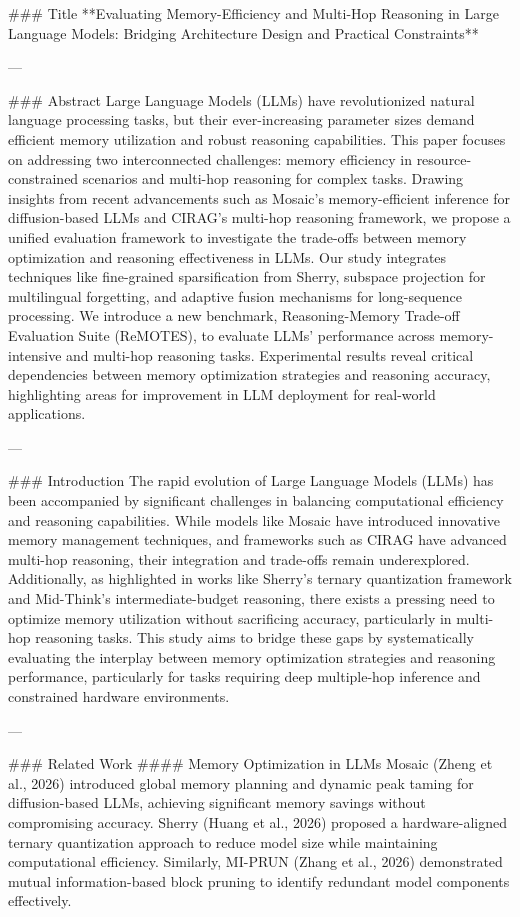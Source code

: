 ### Title  
**Evaluating Memory-Efficiency and Multi-Hop Reasoning in Large Language Models: Bridging Architecture Design and Practical Constraints**

---

### Abstract  
Large Language Models (LLMs) have revolutionized natural language processing tasks, but their ever-increasing parameter sizes demand efficient memory utilization and robust reasoning capabilities. This paper focuses on addressing two interconnected challenges: memory efficiency in resource-constrained scenarios and multi-hop reasoning for complex tasks. Drawing insights from recent advancements such as Mosaic's memory-efficient inference for diffusion-based LLMs and CIRAG's multi-hop reasoning framework, we propose a unified evaluation framework to investigate the trade-offs between memory optimization and reasoning effectiveness in LLMs. Our study integrates techniques like fine-grained sparsification from Sherry, subspace projection for multilingual forgetting, and adaptive fusion mechanisms for long-sequence processing. We introduce a new benchmark, Reasoning-Memory Trade-off Evaluation Suite (ReMOTES), to evaluate LLMs' performance across memory-intensive and multi-hop reasoning tasks. Experimental results reveal critical dependencies between memory optimization strategies and reasoning accuracy, highlighting areas for improvement in LLM deployment for real-world applications.

---

### Introduction  
The rapid evolution of Large Language Models (LLMs) has been accompanied by significant challenges in balancing computational efficiency and reasoning capabilities. While models like Mosaic have introduced innovative memory management techniques, and frameworks such as CIRAG have advanced multi-hop reasoning, their integration and trade-offs remain underexplored. Additionally, as highlighted in works like Sherry’s ternary quantization framework and Mid-Think's intermediate-budget reasoning, there exists a pressing need to optimize memory utilization without sacrificing accuracy, particularly in multi-hop reasoning tasks. This study aims to bridge these gaps by systematically evaluating the interplay between memory optimization strategies and reasoning performance, particularly for tasks requiring deep multiple-hop inference and constrained hardware environments.

---

### Related Work  
#### Memory Optimization in LLMs  
Mosaic (Zheng et al., 2026) introduced global memory planning and dynamic peak taming for diffusion-based LLMs, achieving significant memory savings without compromising accuracy. Sherry (Huang et al., 2026) proposed a hardware-aligned ternary quantization approach to reduce model size while maintaining computational efficiency. Similarly, MI-PRUN (Zhang et al., 2026) demonstrated mutual information-based block pruning to identify redundant model components effectively.

